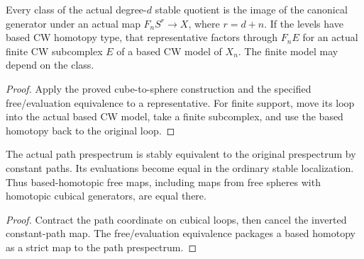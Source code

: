 \begin{proposition}
  \label{prop:actual-free-sphere-stable-representatives}
  \leanok
  Every class of the actual degree-$d$ stable quotient is the image
  of the canonical generator under an actual map $F_nS^r\to X$,
  where $r=d+n$. If the levels have based CW homotopy type, that
  representative factors through $F_nE$ for an actual finite CW
  subcomplex $E$ of a based CW model of $X_n$. The finite model may
  depend on the class.
\end{proposition}
\begin{proof}
  Apply the proved cube-to-sphere construction and the specified
  free/evaluation equivalence to a representative. For finite support,
  move its loop into the actual based CW model, take a finite
  subcomplex, and use the based homotopy back to the original loop.
  \leanok
\end{proof}

\begin{proposition}
  \label{prop:source-based-homotopy-invariance}
  \leanok
  The actual path prespectrum is stably equivalent to the original prespectrum by constant paths. Its evaluations become equal in the ordinary stable localization. Thus based-homotopic free maps, including maps from free spheres with homotopic cubical generators, are equal there.
\end{proposition}
\begin{proof}
  Contract the path coordinate on cubical loops, then cancel the inverted constant-path map. The free/evaluation equivalence packages a based homotopy as a strict map to the path prespectrum.
  \leanok
\end{proof}

